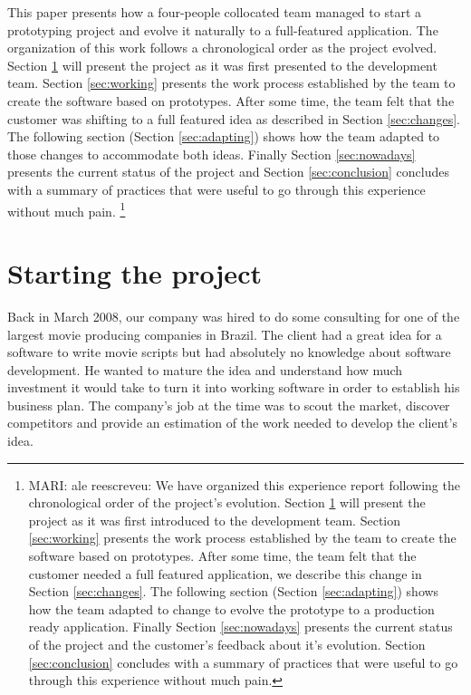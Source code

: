 \documentclass[lnbip]{svmultln}
\newcommand{\mari}[1]{\footnote{MARI: #1}}
\begin{document}
This paper presents how a four-people collocated team managed to start
a prototyping project and evolve it naturally to a full-featured application.
The organization of this work follows a chronological order
as the project evolved. Section \ref{sec:start} will present the
project as it was first presented to the development team. Section
\ref{sec:working} presents the work process established by the team to
create the software based on prototypes.  After some time, the team
felt that the customer was shifting to a full featured idea as
described in Section \ref{sec:changes}. The following section (Section
\ref{sec:adapting}) shows how the team adapted to those changes to
accommodate both ideas. Finally Section \ref{sec:nowadays} presents the
current status of the project and Section \ref{sec:conclusion}
concludes with a summary of practices that were useful to go through
this experience without much pain.
\mari{ale reescreveu: We have organized this experience report following the
chronological order of the project's evolution. Section \ref{sec:start} will
present the project as it was first introduced to the development team. Section
\ref{sec:working} presents the work process established by the team to create
the software based on prototypes. After some time, the team felt that the
customer needed a full featured application, we describe this change in Section
\ref{sec:changes}. The following section (Section \ref{sec:adapting}) shows how
the team adapted to change to evolve the prototype to a production ready
application. Finally Section \ref{sec:nowadays} presents the current status of
the project and the customer's feedback about it's evolution. Section
\ref{sec:conclusion} concludes with a summary of practices that were useful to
go through this experience without much pain.}


\section{Starting the project}
\label{sec:start}

Back in March 2008, our company was hired to do some consulting for
one of the largest movie producing companies in Brazil. The client had
a great idea for a software to write movie scripts but had absolutely
no knowledge about software development.  He wanted to mature the idea
and understand how much investment it would take to turn it into
working software in order to establish his business plan. The
company's job at the time was to scout the market, discover
competitors and provide an estimation of the work needed to develop
the client's idea.
\end{document}
